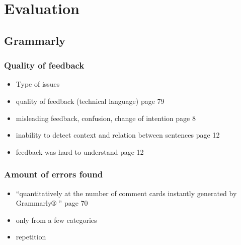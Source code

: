 \documentclass[runningheads]{llncs}
\begin{document}
\section{Evaluation}

\subsection{Grammarly}


\subsubsection{Quality of feedback}

\begin{itemize}
    \item Type of issues
    \item quality of feedback (technical language) \citep{dembsey_closing_2017} page 79
    \item misleading feedback, confusion, change of intention \citep{nova_utilizing_2018} page 8
    \item inability to detect context and relation between sentences \citep{nova_utilizing_2018} page 12
    \item feedback was hard to understand \citep{cavaleri_you_2016} page 12
\end{itemize}

\subsubsection{Amount of errors found}
\begin{itemize}
    \item ``quantitatively at the
number of comment cards instantly generated by Grammarly® ''  \citep{dembsey_closing_2017} page 70
    \item only from a few categories
    \item repetition 
    \
\end{itemize}
\end{document}
